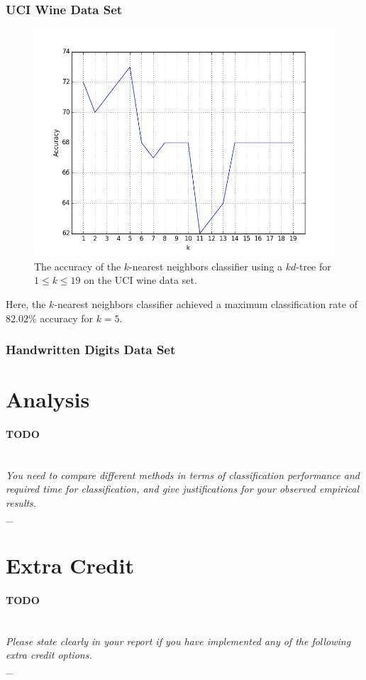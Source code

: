 \documentclass{article}
\numberwithin{figure}{section}
\newcommand{\outline}[2]{\paragraph{\textsc{#1}}\hrulefill~\\{\small\it #2}\\\_\hrulefill}
\newcommand{\todo}[1]{\outline{\large TODO}{#1}}
\begin{document}
\subsubsection{UCI Wine Data Set}
\begin{figure}[H]
\centering
\includegraphics[width=.9\textwidth]{knn_kd_wine}
\caption{The accuracy of the $k$-nearest neighbors classifier using a $kd$-tree for $1 \leq k \leq 19$ on the UCI wine data set.}
\label{knn_wine}
\end{figure}

Here, the $k$-nearest neighbors classifier achieved a maximum classification rate of $82.02\%$ accuracy for $k=5$.

\subsubsection{Handwritten Digits Data Set}


\section{Analysis}
\todo{You need to compare different methods in terms of classification performance and required time for classification, and give justifications for your observed empirical results.}


\section{Extra Credit}
\todo{Please state clearly in your report if you have implemented any of the following extra
credit options.}
\end{document}
